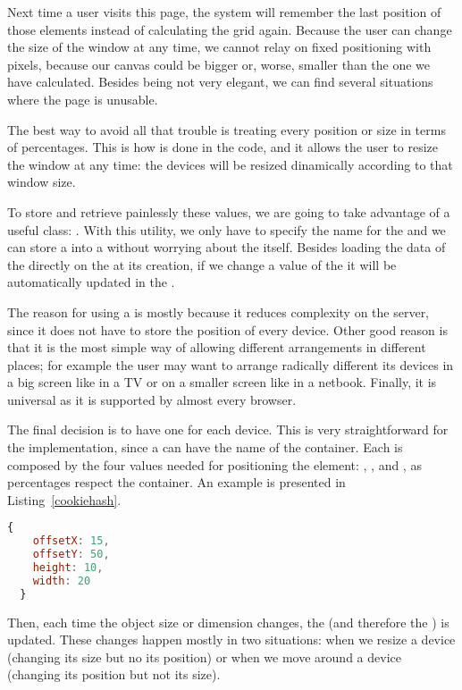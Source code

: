 Next time a user visits this page, the system will remember the last position of those elements instead of calculating the grid again.
Because the user can change the size of the window at any time, we cannot relay on fixed positioning with pixels, because our canvas could be bigger or, worse, smaller than the one we have calculated.
Besides being not very elegant, we can find several situations where the page is unusable.

The best way to avoid all that trouble is treating every position or size in terms of percentages.
This is how is done in the code, and it allows the user to resize the window at any time: the devices will be resized dinamically according to that window size.

To store and retrieve painlessly these values, we are going to take advantage of a useful  class:  \cite{MooHashCookie}.
With this utility, we only have to specify the name for the  and we can store a  into a  without worrying about the  itself.
Besides loading the data of the  directly on the  at its creation, if we change a value of the  it will be automatically updated in the .

The reason for using a  is mostly because it reduces complexity on the server, since it does not have to store the position of every device.
Other good reason is that it is the most simple way of allowing different arrangements in different places; for example the user may want to arrange radically different its devices in a big screen like in a TV or on a smaller screen like in a netbook.
Finally, it is universal as it is supported by almost every browser.

The final decision is to have one  for each device.
This is very straightforward for the implementation, since a  can have the name of the container.
Each  is composed by the four values needed for positioning the element: , ,  and , as percentages respect the container. An example is presented in Listing~\vref{cookiehash}.

\begin{lstlisting}[language=JavaScript,label=cookiehash,caption=Cookie Hash example]
  {
    offsetX: 15,
    offsetY: 50,
    height: 10,
    width: 20
  }
\end{lstlisting}

Then, each time the object size or dimension changes, the  (and therefore the ) is updated.
These changes happen mostly in two situations: when we resize a device (changing its size but no its position) or when we move around a device (changing its position but not its size).
